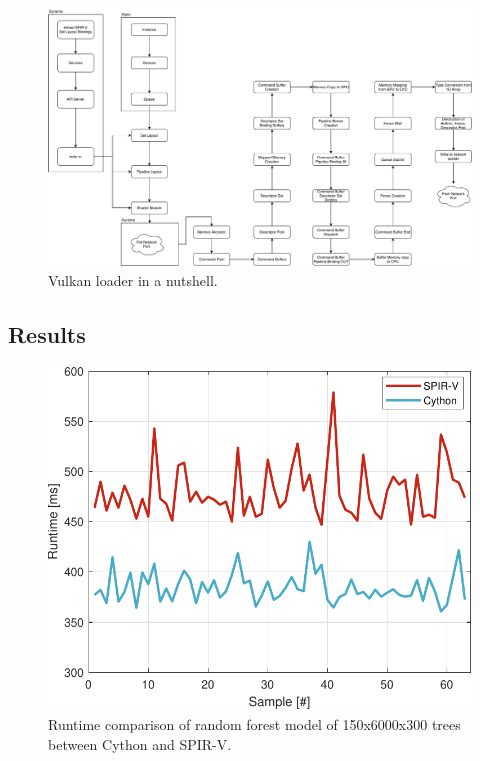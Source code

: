 \documentclass{IEEEtran}
\begin{document}
\begin{figure}
  \centering
  \includegraphics[width=\columnwidth*2]{./assets/vulkan3.pdf}
  \caption{Vulkan loader in a nutshell.}
  \label{fig:vulkan}
\end{figure}

\subsection{Results}
\label{ch:results}

\begin{figure}
  \centering
  \includegraphics[width=\columnwidth]{./assets/bench.pdf}
  \caption{Runtime comparison of random forest model of 150x6000x300 trees between Cython and SPIR-V.}
  \label{fig:bench}
\end{figure}
\end{document}
